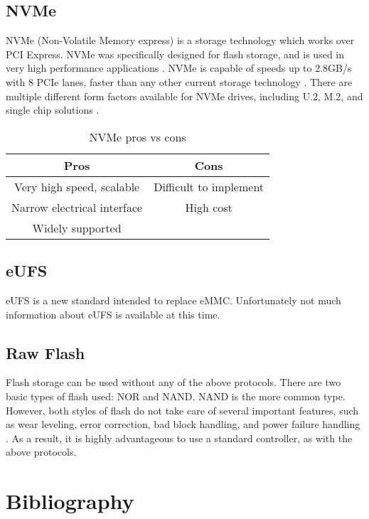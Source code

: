 \documentclass[12pt,article]{memoir}
\begin{document}
\section{NVMe}
NVMe (Non-Volatile Memory express) is a storage technology which works over PCI Express. NVMe was specifically designed for flash storage, and is used in very high performance applications \cite{wiki:nvme}. NVMe is capable of speeds up to 2.8GB/s with 8 PCIe lanes, faster than any other current storage technology \cite{ovh:nvme}. There are multiple different form factors available for NVMe drives, including U.2, M.2, and single chip solutions \cite{siliconmotion:ferrissd}.
\begin{table}[H]
	\centering
	\begin{tabu}{c | c}
		Pros & Cons \\ \hline
		Very high speed, scalable & Difficult to implement\\
		Narrow electrical interface & High cost\\
		Widely supported & \\
	\end{tabu}
	\caption{NVMe pros vs cons}
\end{table}

\section{eUFS}
eUFS is a new standard intended to replace eMMC. Unfortunately not much information about eUFS is available at this time.

\section{Raw Flash}
Flash storage can be used without any of the above protocols. There are two basic types of flash used: NOR and NAND. NAND is the more common type. However, both styles of flash do not take care of several important features, such as wear leveling, error correction, bad block handling, and power failure handling \cite{toradex:flash}. As a result, it is highly advantageous to use a standard controller, as with the above protocols.
\newpage

\chapter{Bibliography}
\printbibliography[heading=none]

\end{document}
